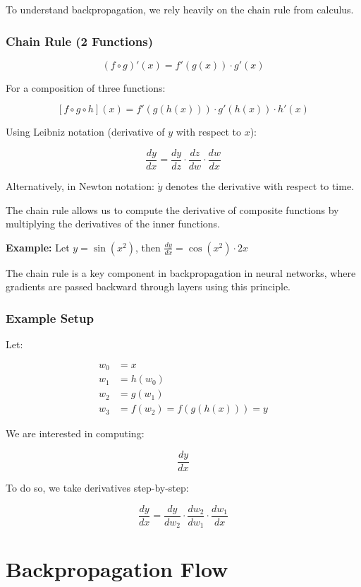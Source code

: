 To understand backpropagation, we rely heavily on the chain rule from calculus.

\subsubsection*{Chain Rule (2 Functions)}

\[
(f \circ g)'(x) = f'(g(x)) \cdot g'(x)
\]

For a composition of three functions:

\[
[f \circ g \circ h](x) = f'(g(h(x))) \cdot g'(h(x)) \cdot h'(x)
\]

Using Leibniz notation (derivative of $y$ with respect to $x$):

\[
\frac{dy}{dx} = \frac{dy}{dz} \cdot \frac{dz}{dw} \cdot \frac{dw}{dx}
\]

Alternatively, in Newton notation: $\dot{y}$ denotes the derivative with respect to time.

The chain rule allows us to compute the derivative of composite functions by multiplying the derivatives of the inner functions.

\textbf{Example:} Let $y = \sin(x^2)$, then $\frac{dy}{dx} = \cos(x^2) \cdot 2x$

The chain rule is a key component in backpropagation in neural networks, where gradients are passed backward through layers using this principle.

\subsubsection*{Example Setup}

Let:

\begin{align*}
w_0 &= x \\
w_1 &= h(w_0) \\
w_2 &= g(w_1) \\
w_3 &= f(w_2) = f(g(h(x))) = y
\end{align*}

We are interested in computing:

\[
\frac{dy}{dx}
\]

To do so, we take derivatives step-by-step:

\[
\frac{dy}{dx} = \frac{dy}{dw_2} \cdot \frac{dw_2}{dw_1} \cdot \frac{dw_1}{dx}
\]

\section{Backpropagation Flow}

